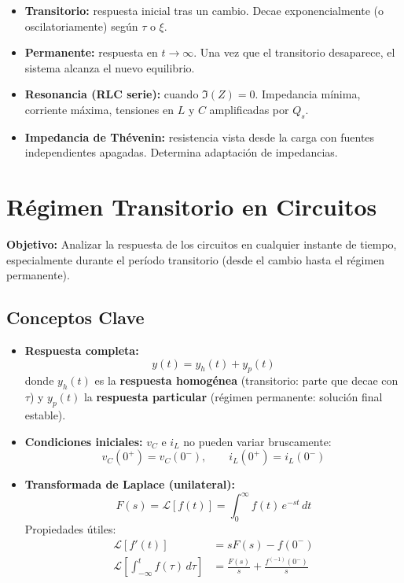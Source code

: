\documentclass[12pt,a4paper]{article}
\begin{document}
\begin{itemize}[leftmargin=2em, itemsep=3pt, parsep=0pt]
  \item[\textbf{Régimen transitorio}] \textbf{Transitorio:} respuesta inicial tras un cambio. Decae exponencialmente (o oscilatoriamente) según $\tau$ o $\xi$.
  \item[\textbf{Régimen permanente}] \textbf{Permanente:} respuesta en $t \to \infty$. Una vez que el transitorio desaparece, el sistema alcanza el nuevo equilibrio.
  \item[\textbf{Resonancia serie}] \textbf{Resonancia (RLC serie):} cuando $\Im(Z) = 0$. Impedancia mínima, corriente máxima, tensiones en $L$ y $C$ amplificadas por $Q_s$.
  \item[\textbf{Factor $Z_{Th}$}] \textbf{Impedancia de Thévenin:} resistencia vista desde la carga con fuentes independientes apagadas. Determina adaptación de impedancias.
\end{itemize}

\section{Régimen Transitorio en Circuitos}

\textbf{Objetivo:} Analizar la respuesta de los circuitos en cualquier instante de tiempo,
especialmente durante el período transitorio (desde el cambio hasta el régimen permanente).

\subsection{Conceptos Clave}

\begin{itemize}[leftmargin=1.5em, itemsep=4pt]

  \item \textbf{Respuesta completa:}
  \[
    y(t) = y_h(t) + y_p(t)
  \]
  donde $y_h(t)$ es la \textbf{respuesta homogénea} (transitorio: parte que decae con $\tau$) y $y_p(t)$ la
  \textbf{respuesta particular} (régimen permanente: solución final estable).

  \item \textbf{Condiciones iniciales:} $v_C$ e $i_L$ no pueden variar bruscamente:
  \[
    v_C(0^+) = v_C(0^-), \qquad i_L(0^+) = i_L(0^-)
  \]

  \item \textbf{Transformada de Laplace (unilateral):}
  \[
    F(s) = \mathcal{L}[f(t)] = \int_0^\infty f(t)\,e^{-st}\,dt
  \]
  Propiedades útiles:
  \begin{align*}
    \mathcal{L}[f'(t)] &= sF(s) - f(0^-)\\
    \mathcal{L}\!\left[\int_{-\infty}^t f(\tau)\,d\tau\right] &= \frac{F(s)}{s}
      + \frac{f^{(-1)}(0^-)}{s}
  \end{align*}
\end{itemize}
\clearpage %
\end{document}
